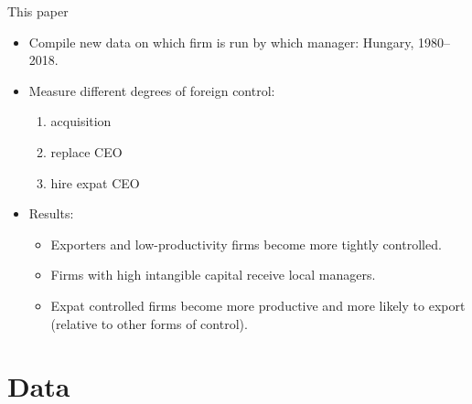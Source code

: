 \documentclass[
  ignorenonframetext,
  aspectratio=43,
]{beamer}
\providecommand{\tightlist}{%
  \setlength{\itemsep}{0pt}\setlength{\parskip}{0pt}}
\begin{document}
\begin{frame}{This paper}
\protect\hypertarget{this-paper}{}
\begin{itemize}
\tightlist
\item
  Compile new data on which firm is run by which manager: Hungary,
  1980--2018.
\item
  Measure different degrees of foreign control:

  \begin{enumerate}
  \tightlist
  \item
    acquisition
  \item
    replace CEO
  \item
    hire expat CEO
  \end{enumerate}
\item
  Results:

  \begin{itemize}
  \tightlist
  \item
    Exporters and low-productivity firms become more tightly controlled.
  \item
    Firms with high intangible capital receive local managers.
  \item
    Expat controlled firms become more productive and more likely to
    export (relative to other forms of control).
  \end{itemize}
\end{itemize}
\end{frame}

\hypertarget{data}{%
\section{Data}\label{data}}
\end{document}
